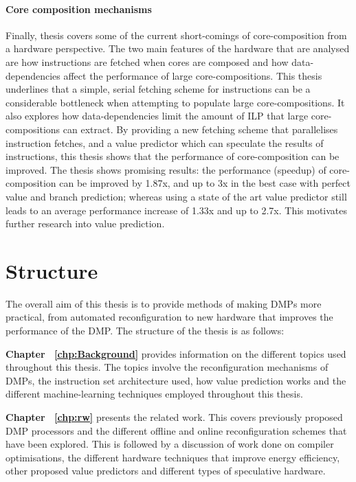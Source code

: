 \paragraph*{Core composition mechanisms} 
Finally, thesis covers some of the current short-comings of core-composition from a hardware perspective.
The two main features of the hardware that are analysed are how instructions are fetched when cores are composed and how data-dependencies affect the performance of large core-compositions.
This thesis underlines that a simple, serial fetching scheme for instructions can be a considerable bottleneck when attempting to populate large core-compositions.
It also explores how data-dependencies limit the amount of ILP that large core-compositions can extract.
By providing a new fetching scheme that parallelises instruction fetches, and a value predictor which can speculate the results of instructions, this thesis shows that the performance of core-composition can be improved.
The thesis shows promising results: the performance (speedup) of core-composition can be improved by 1.87x, and up to 3x in the best case with perfect value and branch prediction; whereas using a state of the art value predictor still leads to an average performance increase of 1.33x and up to 2.7x.
This motivates further research into value prediction.

\section{Structure}
The overall aim of this thesis is to provide methods of making DMPs more practical, from automated reconfiguration to new hardware that improves the performance of the DMP.
The structure of the thesis is as follows:

\textbf{Chapter ~\ref{chp:Background}} provides information on the different topics used throughout this thesis. The topics involve the reconfiguration mechanisms of DMPs, the instruction set architecture used, how value prediction works and the different machine-learning techniques employed throughout this thesis.

\textbf{Chapter ~\ref{chp:rw}} presents the related work. This covers previously proposed DMP processors and the different offline and online reconfiguration schemes that have been explored. 
This is followed by a discussion of work done on compiler optimisations, the different hardware techniques that improve energy efficiency, other proposed value predictors and different types of speculative hardware.

